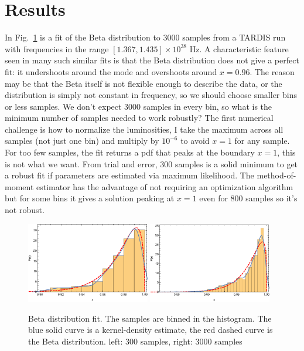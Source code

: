 \documentclass[11pt]{article}
\newcommand{\reffig}[1]{Fig.~\ref{fig:#1}}
\begin{document}
\section{Results}

In \reffig{beta} is a fit of the Beta distribution to 3000
samples from a TARDIS run with frequencies in the range $[1.367,
1.435] \times 10^{38}$ Hz. A characteristic feature seen in many such
similar fits is that the Beta distribution does not give a perfect
fit: it undershoots around the mode and overshoots around
$x=0.96$. The reason may be that the Beta itself is not flexible
enough to describe the data, or the distribution is simply not
constant in frequency, so we should choose smaller bins or less
samples. We don't expect 3000 samples in every bin, so what is the
minimum number of samples needed to work robustly? The first numerical
challenge is how to normalize the luminosities, I take the maximum
across all samples (not just one bin) and multiply by $10^{-6}$ to
avoid $x=1$ for any sample. For too few samples, the fit returns a pdf
that peaks at the boundary $x=1$, this is not what we want. From trial
and error, 300 samples is a solid minimum to get a robust fit if
parameters are estimated via maximum likelihood. The method-of-moment
estimator has the advantage of not requiring an optimization algorithm
but for some bins it gives a solution peaking at $x=1$ even for 800
samples so it's not robust.

\begin{figure}[ht]
  \centering
  \includegraphics[width=0.48\textwidth]{beta-300}
  \includegraphics[width=0.48\textwidth]{beta-3000}
  \caption{Beta distribution fit. The samples are binned in the
    histogram. The blue solid curve is a kernel-density estimate, the
    red dashed curve is the Beta distribution. left: 300 samples,
    right: 3000 samples}
  \label{fig:beta}
\end{figure}
\end{document}
